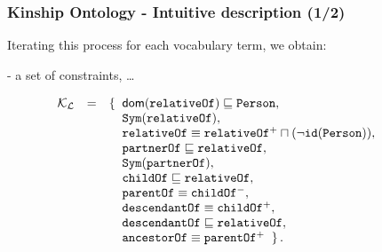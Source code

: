 \documentclass[8pt]{beamer}
\newcommand{\Persons}{\mathtt{Person}}
\newcommand{\relative}{\mathtt{relativeOf}}
\newcommand{\partner}{\mathtt{partnerOf}}
\newcommand{\child}{\mathtt{childOf}}
\newcommand{\parent}{\mathtt{parentOf}}
\newcommand{\ancestor}{\mathtt{ancestorOf}}
\newcommand{\descendant}{\mathtt{descendantOf}}
\newcommand{\KBsets}{\mathcal{K}_{\mathcal{L}}}
\begin{document}
\begin{frame}
\frametitle{Kinship Ontology - Intuitive description (1/2)}
  Iterating this process for each vocabulary term, we obtain: 
  \vspace{.3cm}
  
  - a set of constraints, \ldots
  
\[
\begin{array}{rcl}
\KBsets & = & \{\;\; \dom(\relative) \Issub \Persons,\\
&&\phantom{\{\;\;} \issymmetric{\relative},\\
&&\phantom{\{\;\;} \relative \equiv \relative^{+} \sqcap (\neg 
\roleidentity{\Persons}),~~~~~~~ \\
&&\phantom{\{\;\;} \partner \Issub \relative,\\
&&\phantom{\{\;\;} \issymmetric{\partner},\\
&&\phantom{\{\;\;} \child \Issub \relative,\\
&&\phantom{\{\;\;} \parent \equiv \child^{-},\\
&&\phantom{\{\;\;} \descendant \equiv \child^{+},\\
&&\phantom{\{\;\;} \descendant \Issub \relative,\\
&&\phantom{\{\;\;} \ancestor \equiv \parent^{+}\;\;\}\,.
\end{array}
\]
\end{frame}
\end{document}
